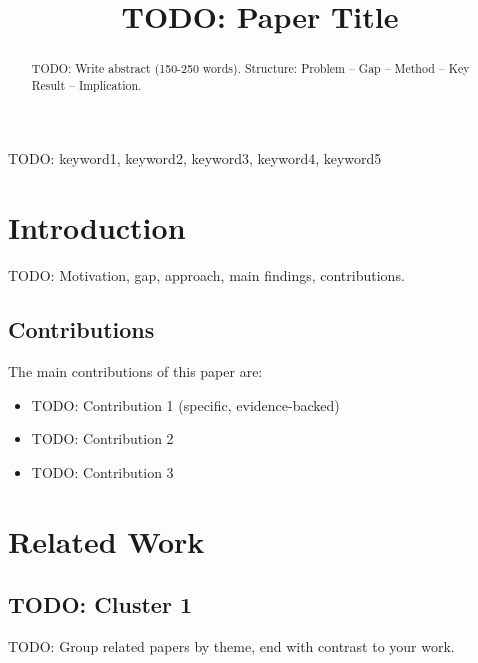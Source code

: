 \documentclass[journal]{IEEEtran}
\begin{document}
\title{TODO: Paper Title}

\author{
}

\maketitle

\begin{abstract}
TODO: Write abstract (150-250 words).
Structure: Problem -- Gap -- Method -- Key Result -- Implication.
\end{abstract}

\begin{IEEEkeywords}
TODO: keyword1, keyword2, keyword3, keyword4, keyword5
\end{IEEEkeywords}

\section{Introduction}
\label{sec:introduction}

TODO: Motivation, gap, approach, main findings, contributions.

\subsection{Contributions}
The main contributions of this paper are:
\begin{itemize}
  \item TODO: Contribution 1 (specific, evidence-backed)
  \item TODO: Contribution 2
  \item TODO: Contribution 3
\end{itemize}

\section{Related Work}
\label{sec:related_work}

\subsection{TODO: Cluster 1}
TODO: Group related papers by theme, end with contrast to your work.
\end{document}
